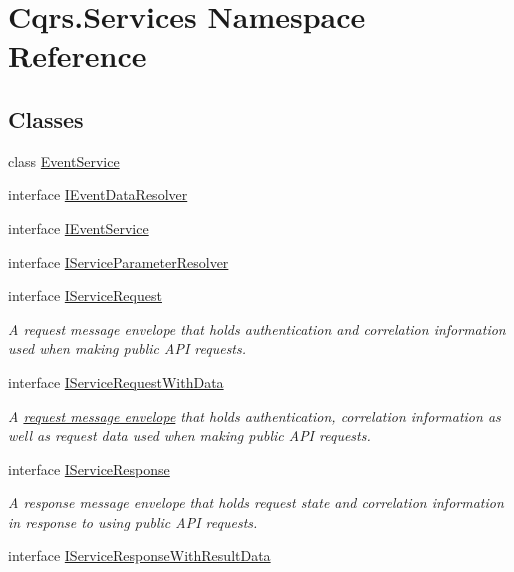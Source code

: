 \hypertarget{namespaceCqrs_1_1Services}{}\section{Cqrs.\+Services Namespace Reference}
\label{namespaceCqrs_1_1Services}
\subsection*{Classes}
\begin{DoxyCompactItemize}
\item 
class \hyperlink{classCqrs_1_1Services_1_1EventService}{Event\+Service}
\item 
interface \hyperlink{interfaceCqrs_1_1Services_1_1IEventDataResolver}{I\+Event\+Data\+Resolver}
\item 
interface \hyperlink{interfaceCqrs_1_1Services_1_1IEventService}{I\+Event\+Service}
\item 
interface \hyperlink{interfaceCqrs_1_1Services_1_1IServiceParameterResolver}{I\+Service\+Parameter\+Resolver}
\item 
interface \hyperlink{interfaceCqrs_1_1Services_1_1IServiceRequest}{I\+Service\+Request}
\begin{DoxyCompactList}\small\item\em A request message envelope that holds authentication and correlation information used when making public A\+PI requests. \end{DoxyCompactList}\item 
interface \hyperlink{interfaceCqrs_1_1Services_1_1IServiceRequestWithData}{I\+Service\+Request\+With\+Data}
\begin{DoxyCompactList}\small\item\em A \hyperlink{}{request message envelope} that holds authentication, correlation information as well as request data used when making public A\+PI requests. \end{DoxyCompactList}\item 
interface \hyperlink{interfaceCqrs_1_1Services_1_1IServiceResponse}{I\+Service\+Response}
\begin{DoxyCompactList}\small\item\em A response message envelope that holds request state and correlation information in response to using public A\+PI requests. \end{DoxyCompactList}\item 
interface \hyperlink{interfaceCqrs_1_1Services_1_1IServiceResponseWithResultData}{I\+Service\+Response\+With\+Result\+Data}

\end{DoxyCompactItemize}
